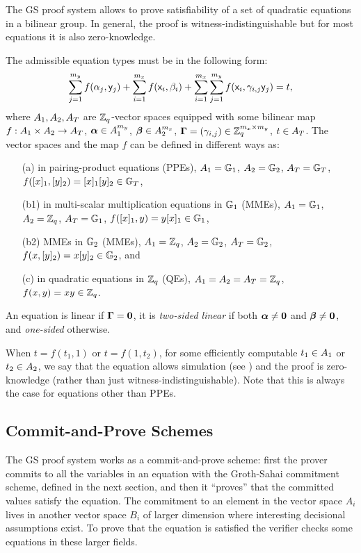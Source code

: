 The GS proof system allows to prove satisfiability of a set of quadratic equations in a bilinear group. In general, the proof is witness-indistinguishable but for most equations it is also zero-knowledge.

The admissible equation types must be in the following form:
\begin{equation}\label{gseq}
\sum_{j=1}^{m_y} f(\alpha_j, \mathsf{y}_j)+\sum_{i=1}^{m_x} f(\mathsf{x}_i, \beta_i)+\sum_{i=1}^{m_x} \sum_{j=1}^{m_y}  f(\mathsf{x}_i,\gamma_{i,j} \mathsf{y}_j)=t,
\end{equation}
 where $A_1,A_2,A_T$ are $\mathbb{Z}_q$-vector spaces equipped with some bilinear map $f:A_1\times A_2 \rightarrow A_T$, $\boldsymbol \alpha  \in A_1^{m_y}$, $\boldsymbol \beta  \in A_2^{m_x}$, $\mathbf{{\Gamma}}=(\gamma_{i,j}) \in \mathbb{Z}_q^{m_x\times m_y}$, $t \in A_T$. The vector spaces and the map $f$ can be defined in different ways as:
\begin{itemize}
\item[(a)] in pairing-product equations (PPEs), $A_1=\mathbb{G}_1$, $A_2=\mathbb{G}_2$, $A_T=\mathbb{G}_T$, $f([x]_1,[y]_2)=[x]_1 [y]_2 \in \mathbb{G}_T$,
\item[(b1)] in multi-scalar multiplication equations in $\mathbb{G}_1$ (MMEs), $A_1=\mathbb{G}_1$, $A_2=\mathbb{Z}_q$, $A_T=\mathbb{G}_1$, $f([x]_1,y)=y [x]_1 \in \mathbb{G}_1$,
\item[(b2)] MMEs in $\mathbb{G}_2$ (MMEs),  $A_1=\mathbb{Z}_q$, $A_2=\mathbb{G}_2$, $A_T=\mathbb{G}_2$, $f(x,[y]_2)=x [y]_2 \in \mathbb{G}_2$, and
\item[(c)] in quadratic equations in $\mathbb{Z}_q$ (QEs), $A_1=A_2=A_T=\mathbb{Z}_q$, $f(x,y)=xy \in \mathbb{Z}_q$.
\end{itemize} 
 An equation is linear if $\mathbf{{\Gamma}}=\mathbf{0}$, 
 it is \textit{two-sided linear} if both $\boldsymbol \alpha \neq \mathbf{0}$ and $\boldsymbol \beta \neq \mathbf{0}$, and \textit{one-sided} otherwise.

When $t=f(t_1,1)$ or $t=f(1,t_2)$, for some efficiently computable $t_1\in A_1$ or $t_2\in A_2$, we say that the equation allows simulation (see \cite[Section~11]{SIAMJC:GroSah12}) and the proof is zero-knowledge (rather than just witness-indistinguishable). Note that this is always the case for equations other than PPEs.

\subsection{Commit-and-Prove Schemes} The GS proof system works as a commit-and-prove scheme: first the prover commits to 
all the variables in an equation with the {Groth-Sahai commitment scheme}, defined in the next section, and then it ``proves'' that the committed values satisfy the equation. The commitment to an element in the vector space $A_i$ lives in another vector space $B_i$ of larger dimension where interesting decisional assumptions exist. To prove that the equation is satisfied the verifier checks some equations in these larger fields.

